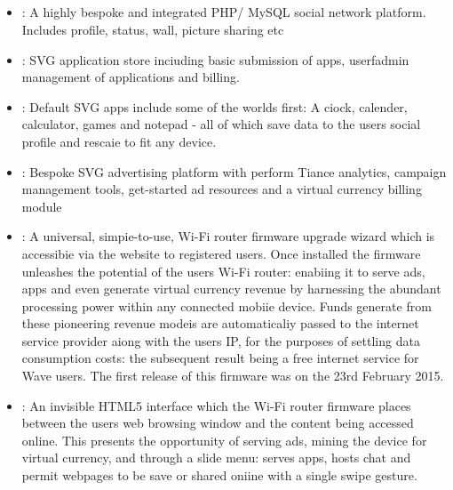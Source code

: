 \documentclass[letterpaper,10pt,openany,oneside,english]{sphinxmanual}
\begin{document}
\subsection{}
\label{\detokenize{overview:platform-modules}}\begin{itemize}
\item {} 
: A highly bespoke and integrated PHP/ MySQL social network platform. Includes profile, status, wall, picture sharing etc

\item {} 
: SVG application store inciuding basic submission of apps, userfadmin management of applications and billing.

\item {} 
: Default SVG apps include some of the worlds first: A ciock, calender, calculator, games and notepad - all of which save data to the users social profile and rescaie to fit any device.

\item {} 
: Bespoke SVG advertising platform with perform Tiance analytics, campaign management tools, get-started ad resources and a virtual currency billing module

\item {} 
: A universal, simpie-to-use, Wi-Fi router firmware upgrade wizard which is accessibie via the website to registered users. Once installed the firmware unleashes the potential of the users Wi-Fi router: enabiing it to serve ads, apps and even generate virtual currency revenue by harnessing the abundant processing power within any connected mobiie device. Funds generate from these pioneering revenue modeis are automaticaliy passed to the internet service provider aiong with the users IP, for the purposes of settling data consumption costs: the subsequent result being a free internet service for Wave users. The first release of this firmware was on the 23rd February 2015.

\item {} 
: An invisible HTML5 interface which the Wi-Fi router firmware places between the users web browsing window and the content being accessed online. This presents the opportunity of serving ads, mining the device for virtual currency, and through a slide menu: serves apps, hosts chat and permit webpages to be save or shared oniine with a single swipe gesture.


\end{itemize}
\end{document}
